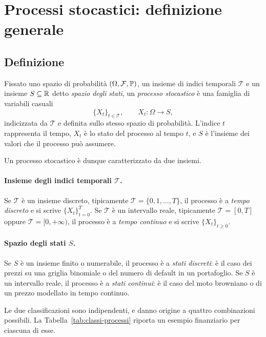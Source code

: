 \section{Processi stocastici: definizione generale}

\subsection{Definizione}

\noindent
Fissato uno spazio di probabilit\`{a} $(\Omega,\mathcal{F},\mathbb{P})$, un insieme
di indici temporali $\mathcal{T}$ e un insieme $S\subseteq\mathbb{R}$ detto
\emph{spazio degli stati}, un \emph{processo stocastico} \`{e} una
famiglia di variabili casuali
\[
\{X_t\}_{t\in\mathcal{T}}, \qquad X_t:\Omega\rightarrow S,
\]
indicizzata da $\mathcal{T}$ e definita sullo stesso spazio di
probabilit\`{a}. L'indice $t$ rappresenta il tempo, $X_t$ \`{e} lo
stato del processo al tempo $t$, e $S$ \`{e} l'insieme dei valori che
il processo pu\`{o} assumere.

Un processo stocastico \`{e} dunque caratterizzato da due insiemi.

\paragraph{Insieme degli indici temporali $\mathcal{T}$.}
Se $\mathcal{T}$ \`{e} un insieme discreto, tipicamente
$\mathcal{T}=\{0,1,\ldots,T\}$, il processo \`{e} a \emph{tempo
discreto} e si scrive $\{X_t\}_{t=0}^{T}$. Se $\mathcal{T}$ \`{e} un
intervallo reale, tipicamente $\mathcal{T}=[0,T]$ oppure
$\mathcal{T}=[0,+\infty)$, il processo \`{e} a \emph{tempo continuo}
e si scrive $\{X_t\}_{t\geq 0}$.

\paragraph{Spazio degli stati $S$.}
Se $S$ \`{e} un insieme finito o numerabile, il processo \`{e} a
\emph{stati discreti}: \`{e} il caso dei prezzi su una griglia
binomiale o del numero di default in un portafoglio. Se $S$ \`{e} un
intervallo reale, il processo \`{e} a \emph{stati continui}: \`{e} il
caso del moto browniano o di un prezzo modellato in tempo continuo.

Le due classificazioni sono indipendenti, e danno origine a quattro
combinazioni possibili. La Tabella~\ref{tab:classi-processi} riporta
un esempio finanziario per ciascuna di esse.

